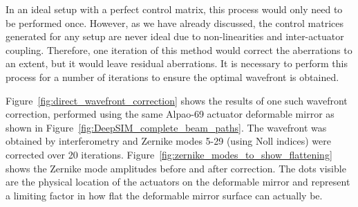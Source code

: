 In an ideal setup with a perfect control matrix, this process would only need to be performed once. However, as we have already discussed, the control matrices generated for any setup are never ideal due to non-linearities and inter-actuator coupling. Therefore, one iteration of this method would correct the aberrations to an extent, but it would leave residual aberrations. It is necessary to perform this process for a number of iterations to ensure the optimal wavefront is obtained. 

Figure~\ref{fig:direct_wavefront_correction} shows the results of one such wavefront correction, performed using the same Alpao-69 actuator deformable mirror as shown in Figure~\ref{fig:DeepSIM_complete_beam_paths}. The wavefront was 
obtained by interferometry and Zernike modes 5-29 (using Noll indices) were corrected over 20 iterations. Figure~\ref{fig:zernike_modes_to_show_flattening}
shows the Zernike mode amplitudes before and after correction. The dots visible are the physical location of the actuators on the deformable mirror and represent a limiting factor in how flat the deformable mirror surface can actually be. 


